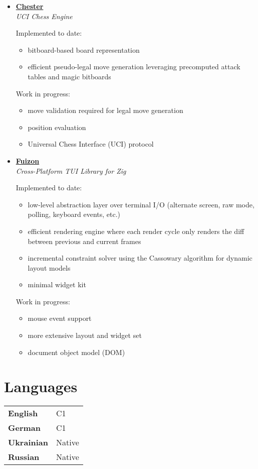 \documentclass[]{article}
\begin{document}
\begin{itemize}[leftmargin=0.15in, label={}]
    \item
        \href{https://github.com/hiegz/chester}{\large\bfseries Chester} \\
        {\itshape UCI Chess Engine}

        Implemented to date:

        \begin{itemize}
            \item bitboard-based board representation
            \item efficient pseudo-legal move generation leveraging precomputed attack tables and magic bitboards
        \end{itemize}

        Work in progress:

        \begin{itemize}
            \item move validation required for legal move generation
            \item position evaluation
            \item Universal Chess Interface (UCI) protocol
        \end{itemize}

    \item
        \href{https://github.com/hiegz/fuizon}{\large\bfseries Fuizon} \\
        {\itshape Cross-Platform TUI Library for Zig}

        Implemented to date:

        \begin{itemize}
            \item low-level abstraction layer over terminal I/O (alternate screen, raw mode, polling, keyboard events, etc.)
            \item efficient rendering engine where each render cycle only renders the diff between previous and current frames
            \item incremental constraint solver using the Cassowary algorithm for dynamic layout models
            \item minimal widget kit
        \end{itemize}

        Work in progress:

        \begin{itemize}
            \item mouse event support
            \item more extensive layout and widget set
            \item document object model (DOM)
        \end{itemize}
\end{itemize}

\section{Languages}

\hspace{0.15in}
\begin{tabular}{@{}ll}
    \textbf{English}   & C1 \\[10pt]
    \textbf{German}    & C1 \\[10pt]
    \textbf{Ukrainian} & Native \\[10pt]
    \textbf{Russian}   & Native \\
\end{tabular}
\end{document}
